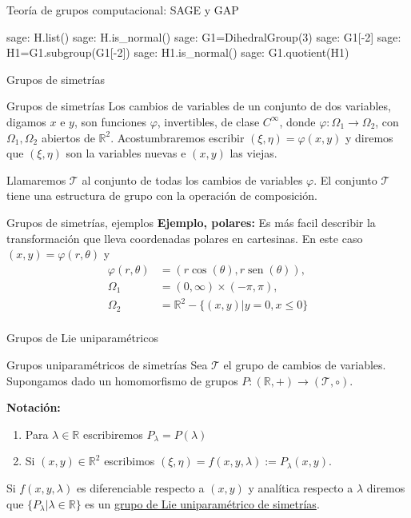 \documentclass[handout,hyperref={colorlinks=true}]{beamer}
\newcommand{\rr}{\mathbb{R}}
\renewcommand{\emph}[1]{\textcolor[rgb]{1,0,0}{#1}}
\DeclareMathOperator{\sen}{sen}
\newcommand{\nl}{\onslide<+-> }
\begin{document}
\begin{frame}[fragile]{Teoría de grupos computacional: SAGE y GAP}
\begin{sagecommandline}
sage: H.list()
sage: H.is_normal()
sage: G1=DihedralGroup(3)
sage: G1[-2]
sage: H1=G1.subgroup(G1[-2])
sage: H1.is_normal()
sage: G1.quotient(H1)
\end{sagecommandline}
\end{frame}

\begin{frame}{Grupos de simetrías}
\nl\begin{block}{Grupos de simetrías}
Los cambios de variables de un conjunto de dos variables, digamos $x$ e $y$, son funciones $\varphi$, invertibles,  de clase $C^{\infty}$, donde $\varphi:\Omega_1\to\Omega_2$, con $\Omega_1,\Omega_2$ abiertos de $\rr^2$. Acostumbraremos escribir $(\xi,\eta)=\varphi(x,y)$ y diremos que $(\xi,\eta)$ son la variables nuevas e $(x,y)$ las viejas.

Llamaremos $\mathscr{T}$ al conjunto de todas los cambios de variables $\varphi$. 
El conjunto  $\mathscr{T}$ tiene una estructura de grupo con la operación de composición.


\end{block}


\end{frame}


\begin{frame}{Grupos de simetrías, ejemplos}
\textbf{Ejemplo, polares:} Es más facil describir la transformación que lleva coordenadas polares en cartesinas. En este caso $(x,y)=\varphi(r,\theta)$ y
\[
\begin{array}{ll}
\varphi(r,\theta)&=(r\cos(\theta),r\sen(\theta)),\\
\Omega_1&=(0,\infty)\times (-\pi,\pi),\\
\Omega_2&=\rr^2-\{(x,y)|y=0,x\leq 0\}\\
\end{array}
\]

\end{frame}

\begin{frame}{Grupos de Lie uniparamétricos}
\nl\begin{block}{Grupos uniparamétricos de simetrías}
Sea $\mathscr{T}$ el grupo de cambios de variables. Supongamos dado un homomorfismo de grupos $P:(\rr,+)\to (\mathscr{T},\circ)$.  

\textbf{Notación:} 
\begin{enumerate}
\item Para $\lambda\in\rr$ escribiremos $P_{\lambda}=P(\lambda)$ 
\item Si $(x,y)\in\rr^2$ escribimos $(\xi,\eta)=f(x,y,\lambda):=P_{\lambda}(x,y)$.
\end{enumerate}
Si $f(x,y,\lambda)$ es diferenciable respecto a $(x,y)$ y analítica respecto a $\lambda$ diremos que $\{P_{\lambda}|\lambda\in\rr\}$ es un \href{http://es.wikipedia.org/wiki/Grupo_uniparamétrico}{\emph{grupo de Lie uniparamétrico de simetrías}}.
\end{block}


\end{frame}
\end{document}
